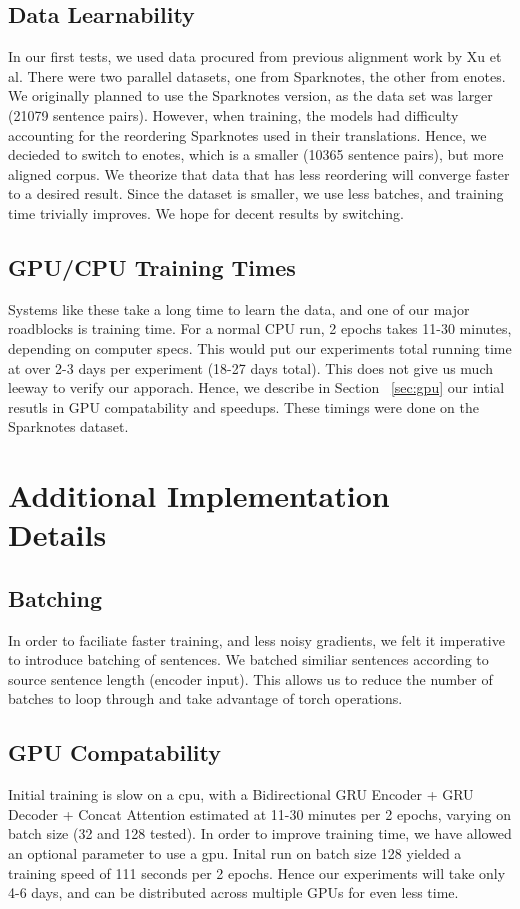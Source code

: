 \documentclass[twoside,twocolumn]{article}
\begin{document}
\subsection{Data Learnability}
In our first tests, we used data procured from previous alignment work
by Xu et al. \cite{xu2012paraphrasing}
There were two parallel datasets, one from Sparknotes, the other from enotes. We
originally planned to use the Sparknotes version, as the data set was larger
(21079 sentence pairs). However, when training, the models had difficulty
accounting for the reordering Sparknotes used in their translations. Hence, we
decieded to switch to enotes, which is a smaller (10365 sentence pairs), but
more aligned corpus. We theorize that data that has less reordering will converge
faster to a desired result. Since the dataset is smaller, we use less batches,
and training time trivially improves. We hope for decent results by switching.


\subsection{GPU/CPU Training Times}
Systems like these take a long time to learn the data, and one of our major
roadblocks is training time. For a normal CPU run, 2 epochs takes 11-30 minutes,
depending on computer specs. This would put our experiments total running time
at over 2-3 days per experiment (18-27 days total). This does not give us much
leeway to verify our
apporach. Hence, we describe in Section ~\ref{sec:gpu} our intial resutls
in GPU compatability and speedups. These timings were done on the Sparknotes
dataset.


\section{Additional Implementation\\Details}
\subsection{Batching}
In order to faciliate faster training, and less noisy gradients, we felt it
imperative to introduce batching of sentences. We batched similiar sentences
according to source sentence length (encoder input). This allows us to reduce
the number of batches to loop through and take advantage of torch operations.

\subsection{GPU Compatability}
Initial training is slow on a cpu, with a Bidirectional GRU Encoder
+ GRU Decoder + Concat Attention estimated at 11-30 minutes per 2 epochs,
varying on batch size (32 and 128 tested). In order to improve training time,
we have allowed an optional parameter to use a gpu. Inital run on batch size 128
yielded a training speed of 111 seconds per 2 epochs. Hence our experiments will
take only 4-6 days, and can be distributed across multiple GPUs for even less
time.
\end{document}
